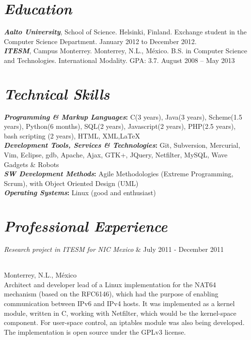 \documentclass{res}
\begin{document}
 
\begin{resume}

\section{\sl  Education}
\textbf{\emph{Aalto University}}, School of Science. Helsinki, Finland. Exchange student in the Computer Science Department. January 2012 to December 2012. \\
\textbf{\emph{ITESM}}, Campus Monterrey. Monterrey, N.L., M\'{e}xico. B.S. in Computer Science and Technologies. International Modality. GPA: 3.7. August 2008 -- May 2013
 
\section{\sl Technical Skills}
 \textbf{\emph{Programming \& Markup Languages}:}
C(3 years), Java(3 years), Scheme(1.5 years), Python(6 months), SQL(2 years), Javascript(2 years), PHP(2.5 years), bash scripting (2 years), HTML, XML,\LaTeX \\
 \textbf{\emph{Development Tools, Services \& Technologies}:}
Git, Subversion, Mercurial, Vim, Eclipse, gdb, 
Apache, Ajax, GTK+, JQuery, Netfilter, MySQL, Wave Gadgets \& Robots \\
 \textbf{\emph{SW Development Methods}:}
Agile Methodologies (Extreme Programming, Scrum), with Object Oriented Design (UML) \\
\textbf{\emph{Operating Systems}:}
Linux (good and enthusiast) \\

\section{\sl Professional Experience}
\begin{ncolumn}{2}
{\it Research project in ITESM for NIC Mexico}  &   July 2011 - December 2011 
\end{ncolumn}\\
Monterrey, N.L., M\'{e}xico \\
Architect and developer lead of a Linux implementation for the NAT64 mechanism (based on the RFC6146), which had the purpose of enabling communication between IPv6 and IPv4 hosts. It was implemented as a kernel module, written in C, working with Netfilter, which would be the kernel-space component. For user-space control, an iptables module was also being developed. The implementation is open source under the GPLv3 license.


\end{resume}
\end{document}
